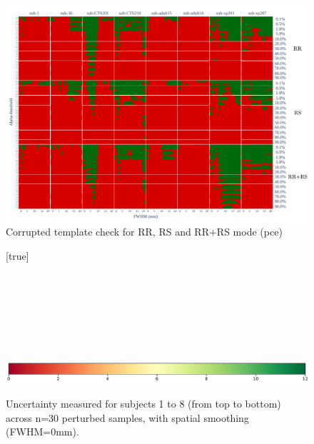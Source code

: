 \documentclass{article}
\begin{document}
\begin{appendices}
    \begin{figure}
        \centering
        \includegraphics[width=\linewidth]{figures/template/template_pce.pdf}
        \caption{Corrupted template check for RR, RS and RR+RS mode (pce)}
    \end{figure}

    \begin{landscape}
        \begin{figure}
            \vspace*{-2cm}
            \centering
            [true] \\
             \\
             \\
             \\
             \\
             \\
             \\
             \\
            \includegraphics*[width=.7\linewidth]{figures/colorbar_sigbit.pdf}
            \caption{Uncertainty measured for subjects 1 to 8 (from top to bottom) across n=30 perturbed samples, with spatial smoothing (FWHM=0mm). }
            \label{fig:uncertainty-maps-0mm}
        \end{figure}
    \end{landscape}


\end{appendices}
\end{document}
